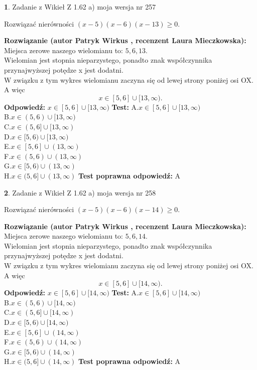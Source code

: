 \documentclass[12pt, a4paper]{article}
\theoremstyle{definition} %
\newtheorem{zad}{}
\newcommand{\zadStart}[1]{\begin{zad}#1\newline}
\newcommand{\zadStop}{\end{zad}}
\newcommand{\rozwStart}[2]{\noindent \textbf{Rozwiązanie (autor #1 , recenzent #2): }\newline}
\newcommand{\rozwStop}{\newline}
\newcommand{\odpStart}{\noindent \textbf{Odpowiedź:}\newline}
\newcommand{\odpStop}{\newline}
\newcommand{\testStart}{\noindent \textbf{Test:}\newline}
\newcommand{\testStop}{\newline}
\newcommand{\kluczStart}{\noindent \textbf{Test poprawna odpowiedź:}\newline}
\newcommand{\kluczStop}{\newline}
\begin{document}
\zadStart{Zadanie z Wikieł Z 1.62 a) moja wersja nr 257}

Rozwiązać nierówności $(x-5)(x-6)(x-13)\ge0$.
\zadStop
\rozwStart{Patryk Wirkus}{Laura Mieczkowska}
Miejsca zerowe naszego wielomianu to: $5, 6, 13$.\\
Wielomian jest stopnia nieparzystego, ponadto znak współczynnika przy\linebreak najwyższej potędze x jest dodatni.\\ W związku z tym wykres wielomianu zaczyna się od lewej strony poniżej osi OX. A więc $$x \in [5,6] \cup [13,\infty).$$
\rozwStop
\odpStart
$x \in [5,6] \cup [13,\infty)$
\odpStop
\testStart
A.$x \in [5,6] \cup [13,\infty)$\\
B.$x \in (5,6) \cup [13,\infty)$\\
C.$x \in (5,6] \cup [13,\infty)$\\
D.$x \in [5,6) \cup [13,\infty)$\\
E.$x \in [5,6] \cup (13,\infty)$\\
F.$x \in (5,6) \cup (13,\infty)$\\
G.$x \in [5,6) \cup (13,\infty)$\\
H.$x \in (5,6] \cup (13,\infty)$
\testStop
\kluczStart
A
\kluczStop



\zadStart{Zadanie z Wikieł Z 1.62 a) moja wersja nr 258}

Rozwiązać nierówności $(x-5)(x-6)(x-14)\ge0$.
\zadStop
\rozwStart{Patryk Wirkus}{Laura Mieczkowska}
Miejsca zerowe naszego wielomianu to: $5, 6, 14$.\\
Wielomian jest stopnia nieparzystego, ponadto znak współczynnika przy\linebreak najwyższej potędze x jest dodatni.\\ W związku z tym wykres wielomianu zaczyna się od lewej strony poniżej osi OX. A więc $$x \in [5,6] \cup [14,\infty).$$
\rozwStop
\odpStart
$x \in [5,6] \cup [14,\infty)$
\odpStop
\testStart
A.$x \in [5,6] \cup [14,\infty)$\\
B.$x \in (5,6) \cup [14,\infty)$\\
C.$x \in (5,6] \cup [14,\infty)$\\
D.$x \in [5,6) \cup [14,\infty)$\\
E.$x \in [5,6] \cup (14,\infty)$\\
F.$x \in (5,6) \cup (14,\infty)$\\
G.$x \in [5,6) \cup (14,\infty)$\\
H.$x \in (5,6] \cup (14,\infty)$
\testStop
\kluczStart
A
\kluczStop
\end{document}
